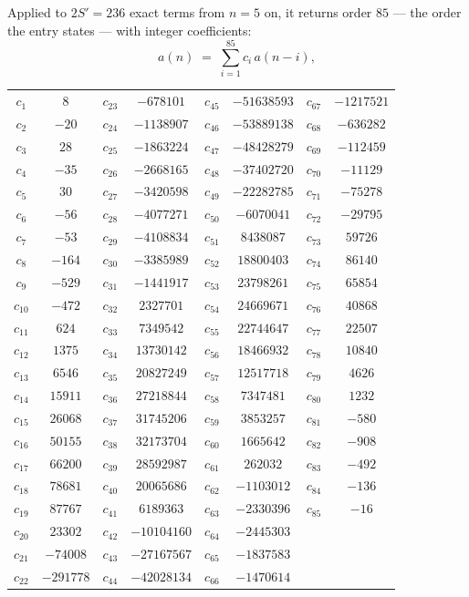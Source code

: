 \documentclass[11pt,a4paper]{article}
\theoremstyle{plain}
\theoremstyle{definition}
\begin{document}
Applied to $2S'=236$ exact terms from $n=5$ on, it returns order $85$ --- the
order the entry states --- with integer coefficients:
\[
a(n)\;=\;\sum_{i=1}^{85}c_i\,a(n-i),
\]
\begin{center}\small
\begin{tabular}{cccccccc}
$c_{1}$ & $8$ & $c_{23}$ & $-678101$ & $c_{45}$ & $-51638593$ & $c_{67}$ & $-1217521$ \\
$c_{2}$ & $-20$ & $c_{24}$ & $-1138907$ & $c_{46}$ & $-53889138$ & $c_{68}$ & $-636282$ \\
$c_{3}$ & $28$ & $c_{25}$ & $-1863224$ & $c_{47}$ & $-48428279$ & $c_{69}$ & $-112459$ \\
$c_{4}$ & $-35$ & $c_{26}$ & $-2668165$ & $c_{48}$ & $-37402720$ & $c_{70}$ & $-11129$ \\
$c_{5}$ & $30$ & $c_{27}$ & $-3420598$ & $c_{49}$ & $-22282785$ & $c_{71}$ & $-75278$ \\
$c_{6}$ & $-56$ & $c_{28}$ & $-4077271$ & $c_{50}$ & $-6070041$ & $c_{72}$ & $-29795$ \\
$c_{7}$ & $-53$ & $c_{29}$ & $-4108834$ & $c_{51}$ & $8438087$ & $c_{73}$ & $59726$ \\
$c_{8}$ & $-164$ & $c_{30}$ & $-3385989$ & $c_{52}$ & $18800403$ & $c_{74}$ & $86140$ \\
$c_{9}$ & $-529$ & $c_{31}$ & $-1441917$ & $c_{53}$ & $23798261$ & $c_{75}$ & $65854$ \\
$c_{10}$ & $-472$ & $c_{32}$ & $2327701$ & $c_{54}$ & $24669671$ & $c_{76}$ & $40868$ \\
$c_{11}$ & $624$ & $c_{33}$ & $7349542$ & $c_{55}$ & $22744647$ & $c_{77}$ & $22507$ \\
$c_{12}$ & $1375$ & $c_{34}$ & $13730142$ & $c_{56}$ & $18466932$ & $c_{78}$ & $10840$ \\
$c_{13}$ & $6546$ & $c_{35}$ & $20827249$ & $c_{57}$ & $12517718$ & $c_{79}$ & $4626$ \\
$c_{14}$ & $15911$ & $c_{36}$ & $27218844$ & $c_{58}$ & $7347481$ & $c_{80}$ & $1232$ \\
$c_{15}$ & $26068$ & $c_{37}$ & $31745206$ & $c_{59}$ & $3853257$ & $c_{81}$ & $-580$ \\
$c_{16}$ & $50155$ & $c_{38}$ & $32173704$ & $c_{60}$ & $1665642$ & $c_{82}$ & $-908$ \\
$c_{17}$ & $66200$ & $c_{39}$ & $28592987$ & $c_{61}$ & $262032$ & $c_{83}$ & $-492$ \\
$c_{18}$ & $78681$ & $c_{40}$ & $20065686$ & $c_{62}$ & $-1103012$ & $c_{84}$ & $-136$ \\
$c_{19}$ & $87767$ & $c_{41}$ & $6189363$ & $c_{63}$ & $-2330396$ & $c_{85}$ & $-16$ \\
$c_{20}$ & $23302$ & $c_{42}$ & $-10104160$ & $c_{64}$ & $-2445303$ &  &  \\
$c_{21}$ & $-74008$ & $c_{43}$ & $-27167567$ & $c_{65}$ & $-1837583$ &  &  \\
$c_{22}$ & $-291778$ & $c_{44}$ & $-42028134$ & $c_{66}$ & $-1470614$ &  &  \\
\end{tabular}
\end{center}
\end{document}
